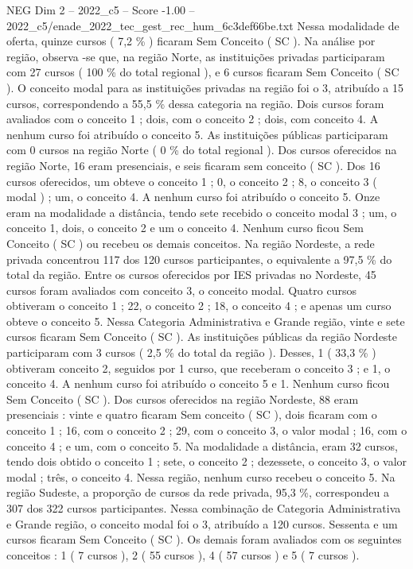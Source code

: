 \begin{textsample}{NEG Dim 2 – 2022\_c5 – Score -1.00 – 2022\_c5/enade\_2022\_tec\_gest\_rec\_hum\_6c3def66be.txt}
Nessa modalidade de oferta, quinze cursos ( 7,2 \% ) ficaram Sem Conceito ( SC ).
Na análise por região, observa -se que, na região Norte, as instituições privadas participaram com 27 cursos ( 100 \% do total regional ), e 6 cursos ficaram Sem Conceito ( SC ).
O conceito modal para as instituições privadas na região foi o 3, atribuído a 15 cursos, correspondendo a 55,5 \% dessa categoria na região.
Dois cursos foram avaliados com o conceito 1 ; dois, com o conceito 2 ; dois, com conceito 4.
A nenhum curso foi atribuído o conceito 5.
As instituições públicas participaram com 0 cursos na região Norte ( 0 \% do total regional ).
Dos cursos oferecidos na região Norte, 16 eram presenciais, e seis ficaram sem conceito ( SC ).
Dos 16 cursos oferecidos, um obteve o conceito 1 ; 0, o conceito 2 ; 8, o conceito 3 ( modal ) ; um, o conceito 4.
A nenhum curso foi atribuído o conceito 5.
Onze eram na modalidade a distância, tendo sete recebido o conceito modal 3 ; um, o conceito 1, dois, o conceito 2 e um o conceito 4.
Nenhum curso ficou Sem Conceito ( SC ) ou recebeu os demais conceitos.
Na região Nordeste, a rede privada concentrou 117 dos 120 cursos participantes, o equivalente a 97,5 \% do total da região.
Entre os cursos oferecidos por IES privadas no Nordeste, 45 cursos foram avaliados com conceito 3, o conceito modal.
Quatro cursos obtiveram o conceito 1 ; 22, o conceito 2 ; 18, o conceito 4 ; e apenas um curso obteve o conceito 5.
Nessa Categoria Administrativa e Grande região, vinte e sete cursos ficaram Sem Conceito ( SC ).
As instituições públicas da região Nordeste participaram com 3 cursos ( 2,5 \% do total da região ).
Desses, 1 ( 33,3 \% ) obtiveram conceito 2, seguidos por 1 curso, que receberam o conceito 3 ; e 1, o conceito 4.
A nenhum curso foi atribuído o conceito 5 e 1.
Nenhum curso ficou Sem Conceito ( SC ).
Dos cursos oferecidos na região Nordeste, 88 eram presenciais : vinte e quatro ficaram Sem conceito ( SC ), dois ficaram com o conceito 1 ; 16, com o conceito 2 ; 29, com o conceito 3, o valor modal ; 16, com o conceito 4 ; e um, com o conceito 5.
Na modalidade a distância, eram 32 cursos, tendo dois obtido o conceito 1 ; sete, o conceito 2 ; dezessete, o conceito 3, o valor modal ; três, o conceito 4.
Nessa região, nenhum curso recebeu o conceito 5.
Na região Sudeste, a proporção de cursos da rede privada, 95,3 \%, correspondeu a 307 dos 322 cursos participantes.
Nessa combinação de Categoria Administrativa e Grande região, o conceito modal foi o 3, atribuído a 120 cursos.
Sessenta e um cursos ficaram Sem Conceito ( SC ).
Os demais foram avaliados com os seguintes conceitos : 1 ( 7 cursos ), 2 ( 55 cursos ), 4 ( 57 cursos ) e 5 ( 7 cursos ).

\end{textsample}
